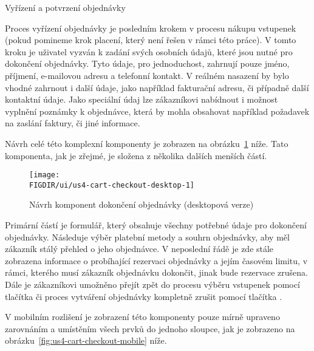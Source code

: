 \begin{subsection}{Vyřízení a potvrzení objednávky}
    \label{subsec:narvh-ui-transformace-uzivatelskych-pribehu-vyrideni-a-potvrzeni-objednavky}
    \userstorycheckout

    Proces vyřízení objednávky je posledním krokem v procesu nákupu vstupenek (pokud pomineme krok placení, který není řešen v rámci této práce).
    V tomto kroku je uživatel vyzván k zadání svých osobních údajů, které jsou nutné pro dokončení objednávky.
    Tyto údaje, pro jednoduchost, zahrnují pouze jméno, příjmení, e-mailovou adresu a telefonní kontakt.
    V reálném nasazení by bylo vhodné zahrnout i další údaje, jako například fakturační adresu, či případně další kontaktní údaje.
    Jako speciální údaj lze zákazníkovi nabídnout i možnost vyplnění poznámky k objednávce, která by mohla obsahovat například požadavek na zaslání faktury, či jiné informace.

    Návrh celé této komplexní komponenty je zobrazen na obrázku~\ref{fig:us4-cart-checkout-desktop} níže.
    Tato komponenta, jak je zřejmé, je složena z několika dalších menších částí.

    \begin{figure}[H]
        \centering
        \texttt{[image: \\FIGDIR/ui/us4-cart-checkout-desktop-1]}
        \caption{Návrh komponent dokončení objednávky (desktopová verze)}
        \label{fig:us4-cart-checkout-desktop}
    \end{figure}

    Primární částí je formulář, který obsahuje všechny potřebné údaje pro dokončení objednávky.
    Následuje výběr platební metody a souhrn objednávky, aby měl zákazník stálý přehled o jeho objednávce.
    V neposlední řádě je zde stále zobrazena informace o probíhající rezervaci objednávky a jejím časovém limitu, v rámci, kterého musí zákazník objednávku dokončit, jinak bude rezervace zrušena.
    Dále je zákazníkovi umožněno přejít zpět do procesu výběru vstupenek pomocí tlačítka  či proces vytváření objednávky kompletně zrušit pomocí tlačítka .

    V mobilním rozlišení je zobrazení této komponenty pouze mírně upraveno zarovnáním a umístěním všech prvků do jednoho sloupce, jak je zobrazeno na obrázku~\ref{fig:us4-cart-checkout-mobile} níže.


\end{subsection}
